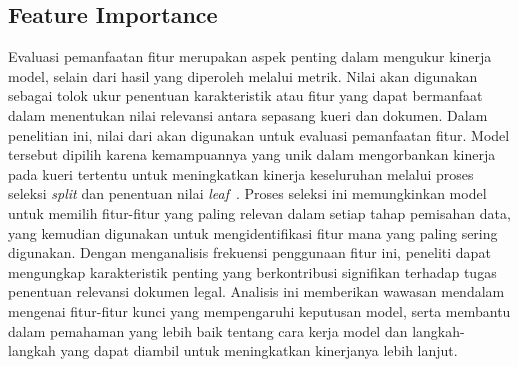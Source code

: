 \subsection{Feature Importance}
\label{subbab:3:Feature Importance}
Evaluasi pemanfaatan fitur merupakan aspek penting dalam mengukur kinerja model, selain dari hasil yang diperoleh melalui metrik. Nilai \feature{} \importance{} akan digunakan sebagai tolok ukur penentuan karakteristik atau fitur yang dapat bermanfaat dalam menentukan nilai relevansi antara sepasang kueri dan dokumen. Dalam penelitian ini, nilai \feature{} \importance{} dari \lambdamart{} akan digunakan untuk evaluasi pemanfaatan fitur. Model \reranker{} tersebut dipilih karena kemampuannya yang unik dalam mengorbankan kinerja pada kueri tertentu untuk meningkatkan kinerja keseluruhan melalui proses seleksi \textit{split} dan penentuan nilai \textit{leaf}~\citep{burges2010ranknet}. Proses seleksi ini memungkinkan model untuk memilih fitur-fitur yang paling relevan dalam setiap tahap pemisahan data, yang kemudian digunakan untuk mengidentifikasi fitur mana yang paling sering digunakan. Dengan menganalisis frekuensi penggunaan fitur ini, peneliti dapat mengungkap karakteristik penting yang berkontribusi signifikan terhadap tugas penentuan relevansi dokumen legal. Analisis ini memberikan wawasan mendalam mengenai fitur-fitur kunci yang mempengaruhi keputusan model, serta membantu dalam pemahaman yang lebih baik tentang cara kerja model dan langkah-langkah yang dapat diambil untuk meningkatkan kinerjanya lebih lanjut.







